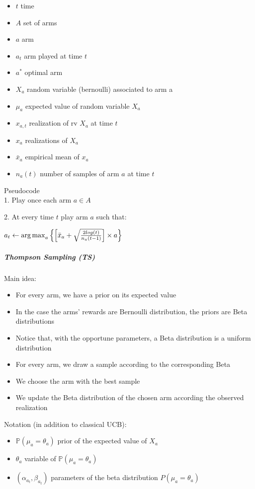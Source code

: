 \begin{itemize}
\item $t$ time
\item $A$ set of arms
\item $a$ arm
\item $a_{t}$ arm played at time $t$
\item $a^*$ optimal arm
\item $X_{a}$ random variable (bernoulli) associated to arm a
\item $\mu_{a}$ expected value of random variable $X_{a}$
\item $x_{a,t}$ realization of rv $X_{a}$ at time $t$
\item $x_{a}$ realizations of $X_{a}$
\item $\bar{x}_{a}$ empirical mean of $x_{a}$
\item $n_{a}(t)$ number of samples of arm $a$ at time $t$
\end{itemize}

Pseudocode\\

1. Play once each arm $a \in A$

2. At every time $t$ play arm $a$ such that:

$a_{t} \leftarrow \operatorname{arg\,max}_a{\left\{\left[\bar{x}_{a} + \sqrt{\frac{2 log(t)}{{n_{a}(t-1)}} }\right]\times a\right\}}$

\subparagraph*{Thompson Sampling (TS)}
Main idea:
\begin{itemize}
	\item For every arm, we have a prior on its expected value 
	\item In the case the arms’ rewards are Bernoulli distribution, the priors are Beta distributions
	\item Notice that, with the opportune parameters, a Beta distribution is a uniform distribution 
	\item For every arm, we draw a sample according to the corresponding Beta
	\item We choose the arm with the best sample 
	\item We update the Beta distribution of the chosen arm according the observed realization
\end{itemize}

Notation (in addition to classical UCB):\\
\begin{itemize}
	\item $\mathbb P(\mu_{a}=\theta_{a})$ prior of the expected value of $X_{a}$
	\item $\theta_{a}$ variable of $\mathbb P(\mu_{a}=\theta_{a})$
	\item $(\alpha_{a_{t}}, \beta_{a_{t}})$ parameters of the beta distribution $P(\mu_{a}=\theta_{a})$
\end{itemize}

